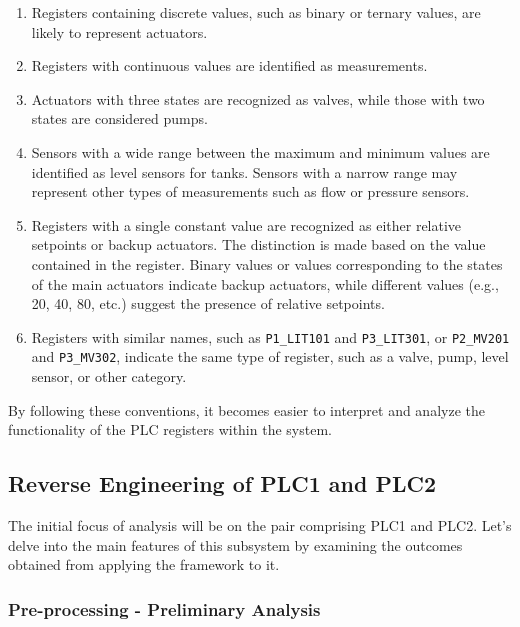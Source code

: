 \begin{enumerate}
	\item Registers containing discrete values, such as binary or ternary values, are likely to represent actuators.
	
	\item Registers with continuous values are identified as measurements.
	
	\item Actuators with three states are recognized as valves, while those with two states are considered pumps.
	
	\item Sensors with a wide range between the maximum and minimum values are identified as level sensors for tanks. Sensors with a narrow range may represent other types of measurements such as flow or pressure sensors.
	
	\item Registers with a single constant value are recognized as either relative setpoints or backup actuators. The distinction is made based on the value contained in the register. Binary values or values corresponding to the states of the main actuators indicate backup actuators, while different values (e.g., 20, 40, 80, etc.) suggest the presence of relative setpoints.

	\item Registers with similar names, such as \texttt{P1\_LIT101} and \texttt{P3\_LIT301}, or \texttt{P2\_MV201} and \texttt{P3\_MV302}, indicate the same type of register, such as a valve, pump, level sensor, or other category.
\end{enumerate}

By following these conventions, it becomes easier to interpret and analyze the functionality of the PLC registers within the system.

\subsection{Reverse Engineering of PLC1 and PLC2}
\label{subsec:6_P1P2_analysis}
The initial focus of analysis will be on the pair comprising PLC1 and PLC2. Let's delve into the main features of this subsystem by examining the outcomes obtained from applying the framework to it.

\subsubsection{Pre-processing - Preliminary Analysis}
\label{subsubsec:6_P1P2_preprocessing}

